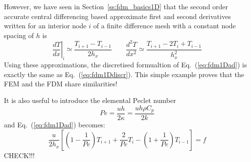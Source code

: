 However, we have seen in Section~\ref{ss:fdm_basics1D} that the 
second order accurate central differencing based approximate first and second
derivatives written for an interior node $i$ 
of a finite difference mesh with a constant node spacing of $h$ is 
\[
\left. \frac{dT}{dx}\right|_i
\simeq \frac{T_{i+1}-T_{i-1}}{2 h_x}
\qquad
\frac{d^2T}{dx^2} 
\simeq \frac{T_{i+1}-2T_i+T_{i-1}}{h_x^2}
\]
Using these approximations, the discretised formualtion of Eq.~(\ref{eq:fdm1Dad}) is
exactly the same as Eq.~(\ref{eq:fdm1Ddiscr}).
This simple example proves that the FEM and the FDM share similarities!


It is also useful to introduce the elemental Peclet number
\[
Pe = \frac{uh}{2 \kappa} = \frac{u h \rho C_p}{2 k}
\]
and Eq.~(\ref{eq:fdm1Dad}) becomes:
\[
\frac{u}{2h_x}
\left[
\left(1-\frac{1}{Pe}\right) T_{i+1} + \frac{2}{Pe} T_i - \left(1+\frac{1}{Pe}\right)T_{i-1} 
\right] = f
\]
CHECK!!!













